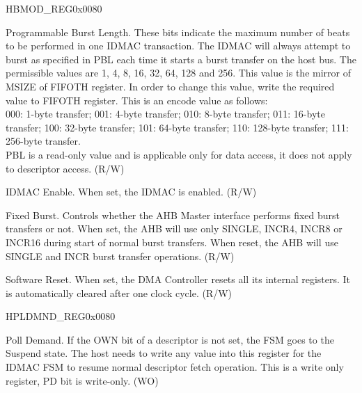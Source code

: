 \begin{register}{H}{BMOD\_REG}{0x0080}\label{regdesc:BMODREG}
%
%
%
%
%
%
\regnewline%
\begin{regdesc}\begin{reglist}
\item [BMOD\_PBL]Programmable Burst Length. These bits indicate the maximum number of beats to be performed in one IDMAC transaction. The IDMAC will always attempt to burst as specified in PBL each time it starts a burst transfer on the host bus. The permissible values are 1, 4, 8, 16, 32, 64, 128 and 256. This value is the mirror of MSIZE of FIFOTH register. In order to change this value, write the required value to FIFOTH register. This is an encode value as follows:\\
000: 1-byte transfer; 001: 4-byte transfer; 010: 8-byte transfer; 011: 16-byte transfer; 100: 32-byte transfer; 101: 64-byte transfer; 110: 128-byte transfer; 111: 256-byte transfer.\\
PBL is a read-only value and is applicable only for data access, it does not apply to descriptor access. (R/W)
\item [BMOD\_DE]IDMAC Enable. When set, the IDMAC is enabled. (R/W)
\item [BMOD\_FB]Fixed Burst. Controls whether the AHB Master interface performs fixed burst transfers or not. When set, the AHB will use only SINGLE, INCR4, INCR8 or INCR16 during start of normal burst transfers. When reset, the AHB will use SINGLE and INCR burst transfer operations. (R/W)
\item [BMOD\_SWR]Software Reset. When set, the DMA Controller resets all its internal registers. It is automatically cleared after one clock cycle. (R/W)
\end{reglist}\end{regdesc}
\end{register}


\begin{register}{H}{PLDMND\_REG}{0x0080}\label{regdesc:PLDMNDREG}
%
\regnewline%
\begin{regdesc}\begin{reglist}
\item [PLDMND\_REG]Poll Demand. If the OWN bit of a descriptor is not set, the FSM goes to the Suspend state. The host needs to write any value into this register for the IDMAC FSM to resume normal descriptor fetch operation. This is a write only register, PD bit is write-only. (WO)
\end{reglist}\end{regdesc}
\end{register}


